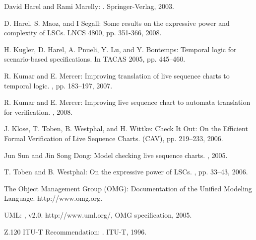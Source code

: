 \documentclass[]{llncs}
\begin{document}
\begin{thebibliography}{10}
David Harel and Rami Marelly:
.
\newblock Springer-Verlag, 2003.

D. Harel, S. Maoz, and I Segall:
\newblock Some results on the expressive power and complexity of LSCs.
\newblock LNCS 4800, pp. 351-366, 2008.


H. Kugler, D. Harel, A. Pnueli, Y. Lu, and Y. Bontemps:
\newblock Temporal logic for scenario-based specifications.
\newblock In TACAS 2005, pp. 445--460.


R. Kumar and E. Mercer:
\newblock Improving translation of live sequence charts to temporal logic.
,
pp. 183--197, 2007.

R. Kumar and E. Mercer:
\newblock Improving live sequence chart to automata translation for verification.
, 2008.



J. Klose, T. Toben, B. Westphal, and H. Wittke:
\newblock Check It Out: On the Efficient Formal Verification of Live Sequence Charts.
 (CAV), pp. 219--233, 2006.

Jun Sun and Jin Song Dong:
\newblock Model checking live sequence charts.
, 2005.



T. Toben and B. Westphal:
\newblock On the expressive power of LSCs.
, pp. 33--43, 2006.

The Object Management Group (OMG):
\newblock Documentation of the Unified Modeling Language.
\newblock http://www.omg.org.

UML:
, v2.0.
\newblock http://www.uml.org/, OMG specification, 2005.

Z.120 ITU-T Recommendation:
.
\newblock ITU-T, 1996.



\end{thebibliography}
\end{document}
